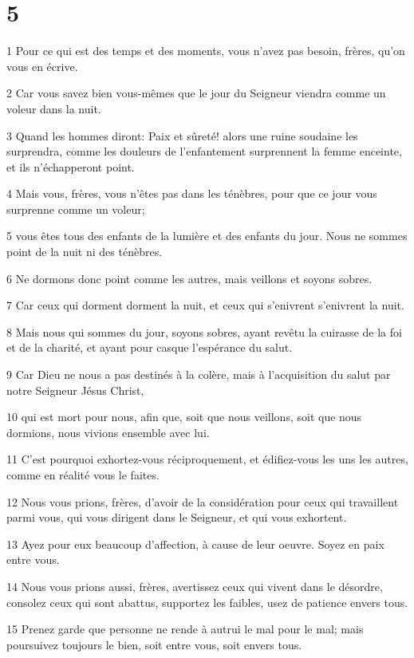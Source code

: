 \chapter{5}

\par 1 Pour ce qui est des temps et des moments, vous n'avez pas besoin, frères, qu'on vous en écrive.
\par 2 Car vous savez bien vous-mêmes que le jour du Seigneur viendra comme un voleur dans la nuit.
\par 3 Quand les hommes diront: Paix et sûreté! alors une ruine soudaine les surprendra, comme les douleurs de l'enfantement surprennent la femme enceinte, et ils n'échapperont point.
\par 4 Mais vous, frères, vous n'êtes pas dans les ténèbres, pour que ce jour vous surprenne comme un voleur;
\par 5 vous êtes tous des enfants de la lumière et des enfants du jour. Nous ne sommes point de la nuit ni des ténèbres.
\par 6 Ne dormons donc point comme les autres, mais veillons et soyons sobres.
\par 7 Car ceux qui dorment dorment la nuit, et ceux qui s'enivrent s'enivrent la nuit.
\par 8 Mais nous qui sommes du jour, soyons sobres, ayant revêtu la cuirasse de la foi et de la charité, et ayant pour casque l'espérance du salut.
\par 9 Car Dieu ne nous a pas destinés à la colère, mais à l'acquisition du salut par notre Seigneur Jésus Christ,
\par 10 qui est mort pour nous, afin que, soit que nous veillons, soit que nous dormions, nous vivions ensemble avec lui.
\par 11 C'est pourquoi exhortez-vous réciproquement, et édifiez-vous les uns les autres, comme en réalité vous le faites.
\par 12 Nous vous prions, frères, d'avoir de la considération pour ceux qui travaillent parmi vous, qui vous dirigent dans le Seigneur, et qui vous exhortent.
\par 13 Ayez pour eux beaucoup d'affection, à cause de leur oeuvre. Soyez en paix entre vous.
\par 14 Nous vous prions aussi, frères, avertissez ceux qui vivent dans le désordre, consolez ceux qui sont abattus, supportez les faibles, usez de patience envers tous.
\par 15 Prenez garde que personne ne rende à autrui le mal pour le mal; mais poursuivez toujours le bien, soit entre vous, soit envers tous.
